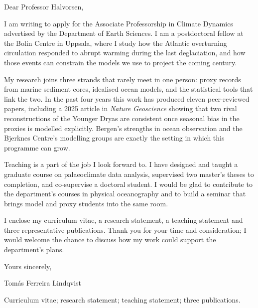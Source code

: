 \documentclass[11pt]{article}
\newcommand{\sendername}{Tomás Ferreira Lindqvist}
\begin{document}
Dear Professor Halvorsen,

I am writing to apply for the Associate Professorship in Climate
Dynamics advertised by the Department of Earth Sciences. I am a
postdoctoral fellow at the Bolin Centre in Uppsala, where I study how
the Atlantic overturning circulation responded to abrupt warming during
the last deglaciation, and how those events can constrain the models we
use to project the coming century.

My research joins three strands that rarely meet in one person: proxy
records from marine sediment cores, idealised ocean models, and the
statistical tools that link the two. In the past four years this work
has produced eleven peer-reviewed papers, including a 2025 article in
\emph{Nature Geoscience} showing that two rival reconstructions of the
Younger Dryas are consistent once seasonal bias in the proxies is
modelled explicitly. Bergen's strengths in ocean observation and the
Bjerknes Centre's modelling groups are exactly the setting in which
this programme can grow.

Teaching is a part of the job I look forward to. I have designed and
taught a graduate course on palaeoclimate data analysis, supervised two
master's theses to completion, and co-supervise a doctoral student. I
would be glad to contribute to the department's courses in physical
oceanography and to build a seminar that brings model and proxy
students into the same room.

I enclose my curriculum vitae, a research statement, a teaching
statement and three representative publications. Thank you for your
time and consideration; I would welcome the chance to discuss how my
work could support the department's plans.

\vspace{1mm}
Yours sincerely,\par
\vspace{1mm}
\par
\vspace{1mm}
\sendername

\vfill
{\footnotesize\color{quiet}\enspace
Curriculum vitae; research statement; teaching statement; three publications.}
\end{document}
